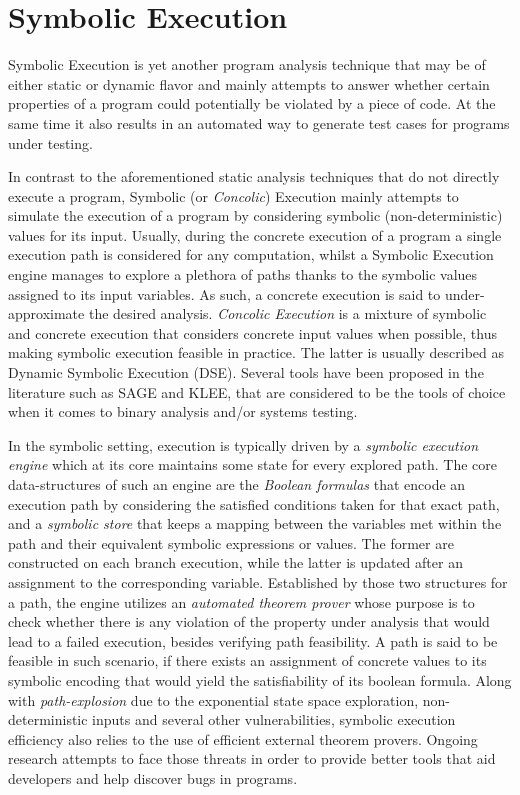 \section{Symbolic Execution}

Symbolic Execution is yet another program analysis technique that
may be of either static or dynamic flavor and mainly attempts
to answer whether certain properties of a program could potentially
be violated by a piece of code\cite{baldoni2018survey}. At the same
time it also results in an automated way to generate test cases for
programs under testing.

In contrast to the aforementioned static analysis techniques that
do not directly execute a program, Symbolic (or \textit{Concolic}) Execution
mainly attempts to simulate the execution of a
program by considering symbolic (non-deterministic) values for its input.
Usually, during the concrete execution of a program a single execution path is
considered for any computation, whilst a Symbolic Execution engine manages
to explore a plethora of paths thanks to the symbolic values assigned to
its input variables. As such, a concrete execution is said to under-approximate
the desired analysis. \textit{Concolic Execution} is a mixture of symbolic and concrete
execution that considers concrete input values when possible, thus making
symbolic execution feasible in practice. The latter is usually described
as Dynamic Symbolic Execution (DSE). Several tools have been proposed
in the literature such as SAGE\cite{godefroid2012sage} and KLEE\cite{cadar2008klee},
that are considered to be the tools of choice when it comes to
binary analysis and/or systems testing.

In the symbolic setting, execution is typically driven by a
\textit{symbolic execution engine} which at its core maintains some state
for every explored path. The core data-structures of such
an engine are the \textit{Boolean formulas} that encode an execution path by
considering the satisfied conditions taken for that exact path, and a
\textit{symbolic store} that keeps a mapping between the variables met within the path
and their equivalent symbolic expressions or values. The former are constructed
on each branch execution, while the latter is updated after an assignment to
the corresponding variable. Established by those two structures for a path,
the engine utilizes an \textit{automated theorem prover} whose purpose is to
check whether there is any violation of the property under analysis that
would lead to a failed execution, besides verifying path feasibility. A path
is said to be feasible in such scenario, if there exists an assignment of
concrete values to its symbolic encoding that would yield the satisfiability
of its boolean formula. Along with \textit{path-explosion} due to the exponential state
space exploration, non-deterministic inputs and several other vulnerabilities,
symbolic execution efficiency also relies to the use of efficient external
theorem provers. Ongoing research attempts to face those threats in order
to provide better tools that aid developers and help discover bugs in
programs.

